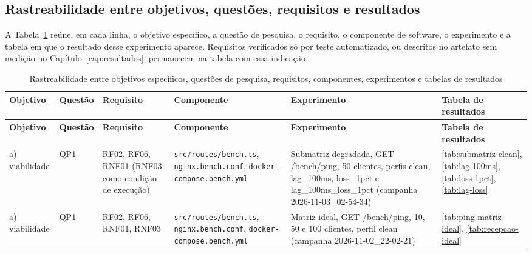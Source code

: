 \subsection{Rastreabilidade entre objetivos, questões, requisitos e resultados}\label{sec:rastreabilidade}

A Tabela~\ref{tab:rastreabilidade} reúne, em cada linha, o objetivo específico, a questão de pesquisa, o requisito, o componente de software, o experimento e a tabela em que o resultado desse experimento aparece. Requisitos verificados só por teste automatizado, ou descritos no artefato sem medição no Capítulo~\ref{cap:resultados}, permanecem na tabela com essa indicação.

\setlength{\tabcolsep}{3pt}
\begin{longtable}{@{}>{\footnotesize\raggedright\arraybackslash}p{20mm}>{\footnotesize\raggedright\arraybackslash}p{11mm}>{\footnotesize\raggedright\arraybackslash}p{22mm}>{\footnotesize\raggedright\arraybackslash}p{32mm}>{\footnotesize\raggedright\arraybackslash}p{38mm}>{\footnotesize\raggedright\arraybackslash}p{18mm}@{}}
\caption[Rastreabilidade entre objetivos, requisitos, experimentos e resultados]{Rastreabilidade entre objetivos específicos, questões de pesquisa, requisitos, componentes, experimentos e tabelas de resultados}\label{tab:rastreabilidade}\\
\hline
\textbf{Objetivo} & \textbf{Questão} & \textbf{Requisito} & \textbf{Componente} & \textbf{Experimento} & \textbf{Tabela de resultados} \\
\hline
\endfirsthead
\hline
\textbf{Objetivo} & \textbf{Questão} & \textbf{Requisito} & \textbf{Componente} & \textbf{Experimento} & \textbf{Tabela de resultados} \\
\hline
\endhead
\hline
\endfoot
\endlastfoot
a) viabilidade & QP1 & RF02, RF06, RNF01 (RNF03 como condição de execução) & \texttt{src/\allowbreak routes/\allowbreak bench.ts}, \texttt{nginx.\allowbreak bench.conf}, \texttt{docker-\allowbreak compose.\allowbreak bench.yml} & Submatriz degradada, GET /bench/ping, 50 clientes, perfis clean, lag\_100ms, loss\_1pct e lag\_100ms\_loss\_1pct (campanha 2026-11-03\_02-54-34) & \ref{tab:submatriz-clean}, \ref{tab:lag-100ms}, \ref{tab:loss-1pct}, \ref{tab:lag-loss} \\
\hline
a) viabilidade & QP1 & RF02, RF06, RNF01, RNF03 & \texttt{src/\allowbreak routes/\allowbreak bench.ts}, \texttt{nginx.\allowbreak bench.conf}, \texttt{docker-\allowbreak compose.\allowbreak bench.yml} & Matriz ideal, GET /bench/ping, 10, 50 e 100 clientes, perfil clean (campanha 2026-11-02\_22-02-21) & \ref{tab:ping-matriz-ideal}, \ref{tab:recepcao-ideal} \\

\end{longtable}
